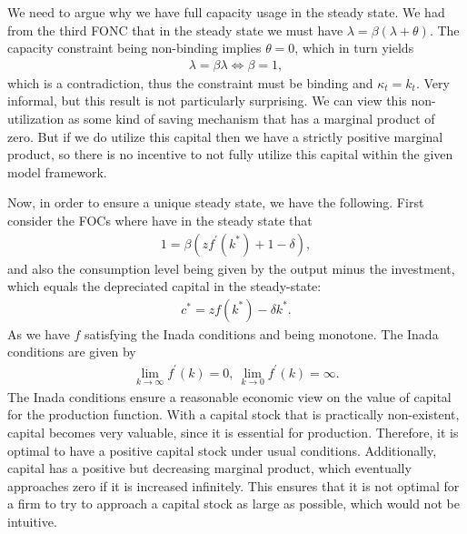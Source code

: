\documentclass[a4paper]{article}
\theoremstyle{definition}
\begin{document}
We need to argue why we have full capacity usage in the steady state. We had from the third FONC that in the steady state we must have $\lambda = \beta (\lambda+\theta)$. The capacity constraint being non-binding implies $\theta = 0$, which in turn yields
	\begin{align*}
	\lambda = \beta \lambda \Leftrightarrow \beta = 1,
	\end{align*}
which is a contradiction, thus the constraint must be binding and $\kappa_t = k_t$. Very informal, but this result is not particularly surprising. We can view this non-utilization as some kind of saving mechanism that has a marginal product of zero. But if we do utilize this capital then we have a strictly positive marginal product, so there is no incentive to not fully utilize this capital within the given model framework.

Now, in order to ensure a unique steady state, we have the following. First consider the FOCs where have in the steady state that
	\begin{align*}
	1 = \beta (z f^\prime(k^*)+1-\delta),
	\end{align*}
and also the consumption level being given by the output minus the investment, which equals the depreciated capital in the steady-state:
	\begin{align*}
	c^* = z f(k^*) - \delta k^*.
	\end{align*}	
As we have $f$ satisfying the Inada conditions and being monotone. The Inada conditions are given by
	\begin{align*}
	\lim\limits_{k\rightarrow\infty}f^\prime(k)=0,\ \lim\limits_{k\rightarrow0} f^\prime(k) = \infty.
	\end{align*}
The Inada conditions ensure a reasonable economic view on the value of capital for the production function. With a capital stock that is practically non-existent, capital becomes very valuable, since it is essential for production. Therefore, it is optimal to have a positive capital stock under usual conditions. Additionally, capital has a positive but decreasing marginal product, which eventually approaches zero if it is increased infinitely. This ensures that it is not optimal for a firm to try to approach a capital stock as large as possible, which would not be intuitive.
\end{document}
